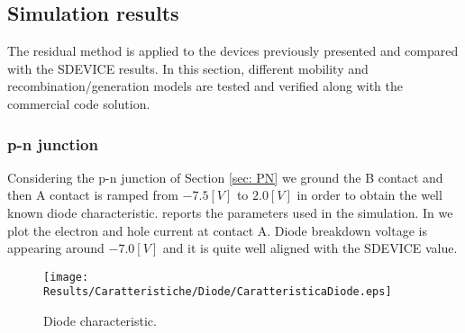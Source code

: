 %
%
%

\subsection{Simulation results}

The residual method is applied to the devices previously presented and compared with the SDEVICE results. In this section, different mobility and recombination/generation models are tested and verified along with the commercial code solution.

\subsubsection{p-n junction}

Considering the p-n junction of Section \ref{sec: PN} we ground the B contact and then A contact is ramped from $-7.5[V]$ to $2.0[V]$ in order to obtain the well known diode characteristic. 
 reports the parameters used in the simulation.
In   we plot the electron and hole current at contact A.
Diode breakdown voltage is appearing around $-7.0[V]$ and it is quite well aligned with the SDEVICE value.

\vspace{0.5cm}

\begin{figure}[!h]
\centering
\texttt{[image: Results/Caratteristiche/Diode/CaratteristicaDiode.eps]}
\caption{Diode characteristic.}
\label{fig: caratteristica diode}
\end{figure}

\vspace{0.5cm}

